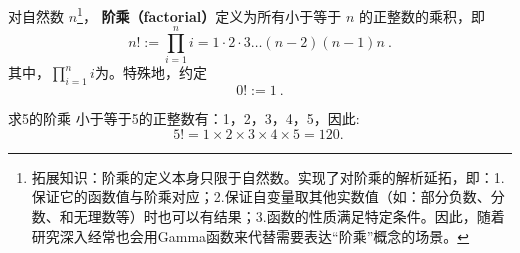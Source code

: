 
\begin{issues}
\issueDraft
\end{issues}


对自然数 $n$\footnote{拓展知识：阶乘的定义本身只限于自然数。实现了对阶乘的解析延拓，即：1.保证它的函数值与阶乘对应；2.保证自变量取其他实数值（如：部分负数、分数、和无理数等）时也可以有结果；3.函数的性质满足特定条件。因此，随着研究深入经常也会用Gamma函数来代替需要表达“阶乘”概念的场景。}， \textbf{阶乘（factorial）}定义为所有小于等于 $n$ 的正整数的乘积，即
\begin{equation}
n! := \prod_{i = 1}^n i =1 \cdot 2 \cdot 3 \dots (n - 2) (n - 1)n~.
\end{equation}
其中，$\prod_{i = 1}^n i$为。特殊地，约定
\begin{equation}
0! := 1~.
\end{equation}

\begin{example}{求5的阶乘}
小于等于5的正整数有：1，2，3，4，5，因此:
$$5! = 1\times 2\times 3\times 4\times 5 = 120.~$$
\end{example}

